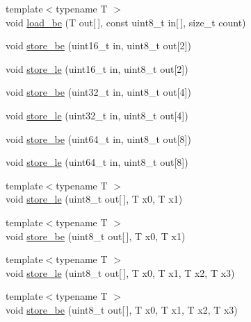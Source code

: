 \begin{DoxyCompactItemize}
\item 
{\footnotesize template$<$typename T $>$ }\\void \mbox{\hyperlink{namespace_botan_a0b13c515a5a6599c5074fd9471192b69}{load\+\_\+be}} (T out\mbox{[}$\,$\mbox{]}, const uint8\+\_\+t in\mbox{[}$\,$\mbox{]}, size\+\_\+t count)
\item 
void \mbox{\hyperlink{namespace_botan_a26f4a43173adf5f333b598149c3eef1e}{store\+\_\+be}} (uint16\+\_\+t in, uint8\+\_\+t out\mbox{[}2\mbox{]})
\item 
void \mbox{\hyperlink{namespace_botan_ac0c49ee3a99775f2fba422752fdbc21a}{store\+\_\+le}} (uint16\+\_\+t in, uint8\+\_\+t out\mbox{[}2\mbox{]})
\item 
void \mbox{\hyperlink{namespace_botan_a237738c57bc371f45785750daad2cf7f}{store\+\_\+be}} (uint32\+\_\+t in, uint8\+\_\+t out\mbox{[}4\mbox{]})
\item 
void \mbox{\hyperlink{namespace_botan_aced6f16a306b58cc117c3a03e04cf788}{store\+\_\+le}} (uint32\+\_\+t in, uint8\+\_\+t out\mbox{[}4\mbox{]})
\item 
void \mbox{\hyperlink{namespace_botan_af55277e5a97f10bb1f19a121bfcce030}{store\+\_\+be}} (uint64\+\_\+t in, uint8\+\_\+t out\mbox{[}8\mbox{]})
\item 
void \mbox{\hyperlink{namespace_botan_ac123595229ef6588f851540b9b774800}{store\+\_\+le}} (uint64\+\_\+t in, uint8\+\_\+t out\mbox{[}8\mbox{]})
\item 
{\footnotesize template$<$typename T $>$ }\\void \mbox{\hyperlink{namespace_botan_a0bf3a60376720003e37586a548175426}{store\+\_\+le}} (uint8\+\_\+t out\mbox{[}$\,$\mbox{]}, T x0, T x1)
\item 
{\footnotesize template$<$typename T $>$ }\\void \mbox{\hyperlink{namespace_botan_adf2d43d6f22f9440efca19d126179271}{store\+\_\+be}} (uint8\+\_\+t out\mbox{[}$\,$\mbox{]}, T x0, T x1)
\item 
{\footnotesize template$<$typename T $>$ }\\void \mbox{\hyperlink{namespace_botan_a7ba9e7bbb06b5843eb883b1fdbe22848}{store\+\_\+le}} (uint8\+\_\+t out\mbox{[}$\,$\mbox{]}, T x0, T x1, T x2, T x3)
\item 
{\footnotesize template$<$typename T $>$ }\\void \mbox{\hyperlink{namespace_botan_a2c8b865c60e5d60524c7c79d66b4b120}{store\+\_\+be}} (uint8\+\_\+t out\mbox{[}$\,$\mbox{]}, T x0, T x1, T x2, T x3)
\item 

\end{DoxyCompactItemize}
